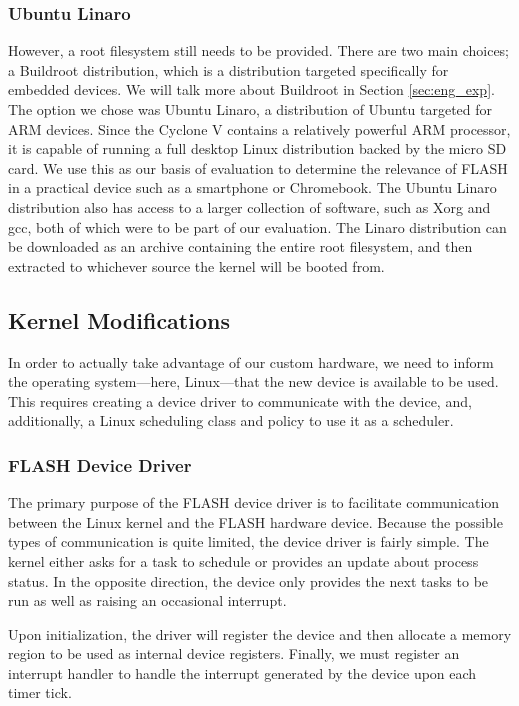 \documentclass{sig-alternate-10pt}
\begin{document}
\subsubsection{Ubuntu Linaro}
\label{subsubsec:linaro}
However, a root filesystem still needs to be provided. There are two main choices; a Buildroot distribution, which is a distribution targeted specifically for embedded devices. We will talk more about Buildroot in Section \ref{sec:eng_exp}. The option we chose was Ubuntu Linaro, a distribution of Ubuntu targeted for ARM devices. Since the Cyclone V contains a relatively powerful ARM processor, it is capable of running a full desktop Linux distribution backed by the micro SD card. We use this as our basis of evaluation to determine the relevance of FLASH in a practical device such as a smartphone or Chromebook. The Ubuntu Linaro distribution also has access to a larger collection of software, such as Xorg and gcc, both of which were to be part of our evaluation. The Linaro distribution can be downloaded as an archive containing the entire root filesystem, and then extracted to whichever source the kernel will be booted from.

\subsection{Kernel Modifications}
In order to actually take advantage of our custom hardware, we need to
inform the operating system---here, Linux---that the new device is available
to be used.  This requires creating a device driver to communicate with the
device, and, additionally, a Linux scheduling class and policy to use it as
a scheduler.

\subsubsection{FLASH Device Driver}
The primary purpose of the FLASH device driver is to facilitate
communication between the Linux kernel and the FLASH hardware device.
Because the possible types of communication is quite limited, the device
driver is fairly simple.  The kernel either asks for a task to schedule or
provides an update about process status.  In the opposite direction, the
device only provides the next tasks to be run as well as raising an
occasional interrupt.

Upon initialization, the driver will register the device and then allocate
a memory region to be used as internal device registers.  Finally, we must
register an interrupt handler to handle the interrupt generated by the
device upon each timer tick.
\end{document}
